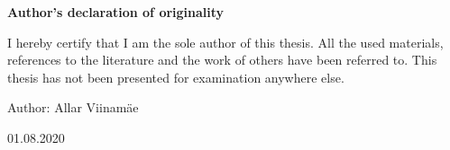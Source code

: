 
\begin{titlepage}


\vspace*{2cm}

\begin{center}
{\Large \textbf{Author’s declaration of originality}}
\end{center}

\vspace*{1cm}

I hereby certify that I am the sole author of this thesis. All the used materials, references to the literature and the work of others have been referred to. This thesis has not been presented for examination anywhere else.

\vspace{3mm}

\begin{flushleft}
Author: Allar Viinamäe

\vspace{3mm}

01.08.2020

\end{flushleft}
        
\end{titlepage}